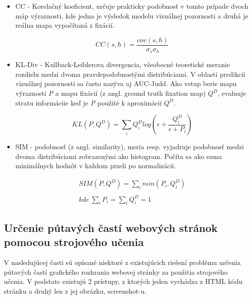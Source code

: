\begin{itemize}
	\item CC - Korelačný koeficient, určuje prakticky podobnosť v tomto prípade dvoch máp výraznosti, kde jedna je výsledok modelu vizuálnej pozornosti a druhá je reálna mapa vypočítaná z fixácií. 
	
	\begin{equation}
	CC (s, h) = \frac{cov(s, h)}{\sigma_{s} \sigma _{h}}
	\end{equation}
	
	\item KL-Div - Kullback-Leiblerova divergencia\cite{bylinskii2016different}, všeobecné teoretické meranie rozdielu medzi dvoma pravdepodobnostými distribúciami. V oblasti predikcií vizuálnej pozornosti sa často nazýva aj AUC-Judd. Ako vstup berie mapu výraznosti \textit{P} a mapu fixácií (z angl.  ground  truth  fixation map) \textit{$Q^{D}$}, evaluuje stratu informáciie keď je \textit{P} použité k aproximácii \textit{$Q^{D}$}.
	
	\begin{equation}
		KL (P, Q^D) =  \sum_{i} Q_{i}^{D} log \left ( \epsilon + \frac{Q_{i}^{D}}{\epsilon + P_i} \right )
	\end{equation}
	
	\item SIM - podobnosť (z angl. similarity), meria resp. vyjadruje podobnosť medzi dvoma distribúciami zobrazenými ako histogram. Počíta sa ako suma minimálnych hodnôt v každom pixeli po normalizácii. 
	
	\begin{equation}
		\begin{aligned}
			SIM (P, Q^{D}) = \sum_{i} min (P_{i}, Q_{i}^{D})
			\\
			\\
			kde \ \sum_{i} P_{i} = \sum_{i} Q_{i}^{D} = 1 \ \ \ \ \ \ \ \ \ \ \ \ \ \ \
		\end{aligned}
	\end{equation}
	
		
	
	
\end{itemize}
 
 
\iffalse	
\subsection{Určenie pútavých častí webových stránok pomocou strojového učenia}
\label{machine_learning}
	V nasledujúcej časti sú opísané niektoré z existujúcich riešení problému určenia pútavých častí grafického rozhrania webovej stránky za použitia strojového učenia. V podstate existujú 2 prístupy, z ktorých jeden vychádza z HTML kódu stránku a druhý len z jej obrázku, screenshot-u. 
	


